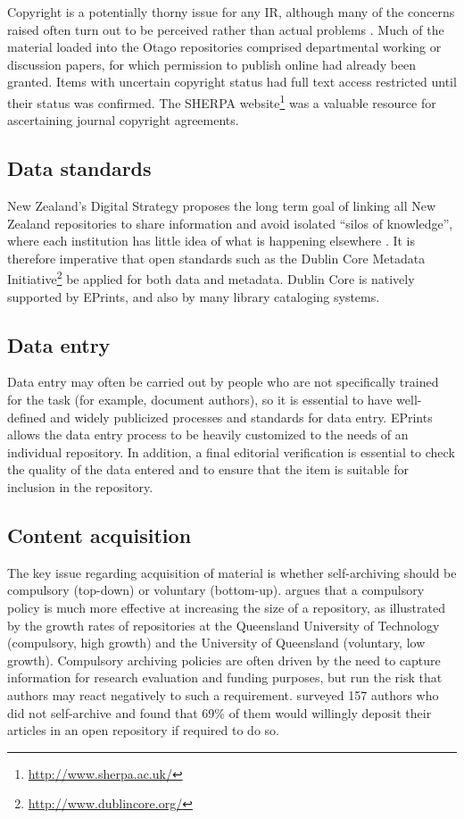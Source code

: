 \documentclass[12pt,pdftex,a4paper,titlepage]{article}
\begin{document}
Copyright is a potentially thorny issue for any IR, although many of the concerns raised often turn out to be perceived rather than actual problems \cite{EPri-O-2005-SelfFAQ}. Much of the material loaded into the Otago repositories comprised departmental working or discussion papers, for which permission to publish online had already been granted. Items with uncertain copyright status had full text access restricted until their status was confirmed. The SHERPA website\footnote{\url{http://www.sherpa.ac.uk/}} was a valuable resource for ascertaining journal copyright agreements.


\subsection{Data standards}

New Zealand's Digital Strategy proposes the long term goal of linking all New Zealand repositories to share information and avoid isolated ``silos of knowledge'', where each institution has little idea of what is happening elsewhere \cite{NZG-2005-digital_strategy}. It is therefore imperative that open standards such as the Dublin Core Metadata Initiative\footnote{\url{http://www.dublincore.org/}} be applied for both data and metadata. Dublin Core is natively supported by EPrints, and also by many library cataloging systems.


\subsection{Data entry}

Data entry may often be carried out by people who are not specifically trained for the task (for example, document authors), so it is essential to have well-defined and widely publicized processes and standards for data entry. EPrints allows the data entry process to be heavily customized to the needs of an individual repository. In addition, a final editorial verification is essential to check the quality of the data entered and to ensure that the item is suitable for inclusion in the repository.


\subsection{Content acquisition}
\label{sec-content}

The key issue regarding acquisition of material is whether self-archiving should be compulsory (top-down) or voluntary (bottom-up).  argues that a compulsory policy is much more effective at increasing the size of a repository, as illustrated by the growth rates of repositories at the Queensland University of Technology (compulsory, high growth) and the University of Queensland (voluntary, low growth). Compulsory archiving policies are often driven by the need to capture information for research evaluation and funding purposes, but run the risk that authors may react negatively to such a requirement.  surveyed 157 authors who did not self-archive and found that 69\% of them would willingly deposit their articles in an open repository if required to do so.
\end{document}
